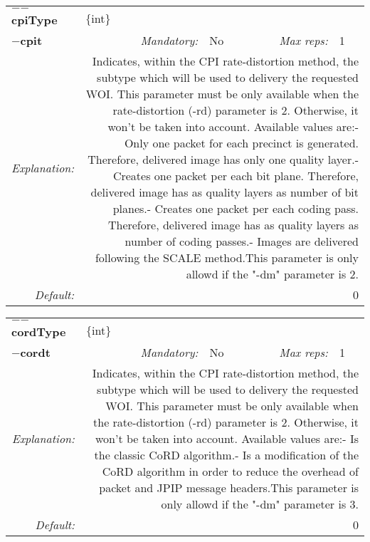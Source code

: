 \begin{center}\begin{tabular}{|rr|rl|rl|}
\hline
\multicolumn{2}{|l|}{\textbf{$-$$-$cpiType}} & \multicolumn{4}{|l|}{$\{$int$\}$} \\
\cline{3-6}
\multicolumn{2}{|l|}{\textbf{$-$cpit}} & \emph{Mandatory:} & No & \emph{Max reps:} & 1 \\
\hline
\emph{Explanation:} & \multicolumn{5}{|p{12cm}|}{Indicates, within the CPI rate-distortion method, the subtype which will be used to delivery the requested WOI. This parameter must be only available when the rate-distortion (-rd) parameter is 2. Otherwise, it won't be taken into account. Available values are:\newline	1- Only one packet for each precinct is generated. Therefore, delivered image has only one quality layer.\newline	2- Creates one packet per each bit plane. Therefore, delivered image has as quality layers as number of bit planes.\newline	3- Creates one packet per each coding pass. Therefore, delivered image has as quality layers as number of coding passes.\newline 4- Images are delivered following the SCALE method.\newline This parameter is only allowd if the "-dm" parameter is 2.} \\
\hline
\emph{Default:} & \multicolumn{5}{|p{12cm}|}{0} \\
\hline
\end{tabular}\end{center}
\begin{center}\begin{tabular}{|rr|rl|rl|}
\hline
\multicolumn{2}{|l|}{\textbf{$-$$-$cordType}} & \multicolumn{4}{|l|}{$\{$int$\}$} \\
\cline{3-6}
\multicolumn{2}{|l|}{\textbf{$-$cordt}} & \emph{Mandatory:} & No & \emph{Max reps:} & 1 \\
\hline
\emph{Explanation:} & \multicolumn{5}{|p{12cm}|}{Indicates, within the CPI rate-distortion method, the subtype which will be used to delivery the requested WOI. This parameter must be only available when the rate-distortion (-rd) parameter is 2. Otherwise, it won't be taken into account. Available values are:\newline	1- Is the classic CoRD algorithm.\newline	2- Is a modification of the CoRD algorithm in order to reduce the overhead of packet and JPIP message headers.\newline This parameter is only allowd if the "-dm" parameter is 3.} \\
\hline
\emph{Default:} & \multicolumn{5}{|p{12cm}|}{0} \\
\hline
\end{tabular}\end{center}

